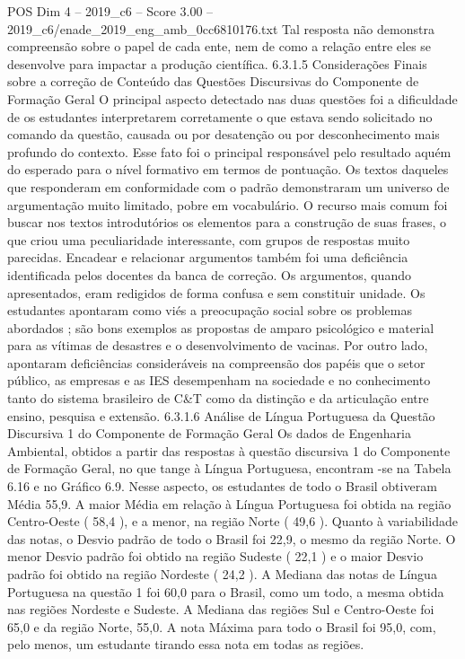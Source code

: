 \begin{textsample}{POS Dim 4 – 2019\_c6 – Score 3.00 – 2019\_c6/enade\_2019\_eng\_amb\_0cc6810176.txt}
Tal resposta não demonstra compreensão sobre o papel de cada ente, nem de como a relação entre eles se desenvolve para impactar a produção científica. 6.3.1.5 Considerações Finais sobre a correção de Conteúdo das Questões Discursivas do Componente de Formação Geral O principal aspecto detectado nas duas questões foi a dificuldade de os estudantes interpretarem corretamente o que estava sendo solicitado no comando da questão, causada ou por desatenção ou por desconhecimento mais profundo do contexto.
Esse fato foi o principal responsável pelo resultado aquém do esperado para o nível formativo em termos de pontuação.
Os textos daqueles que responderam em conformidade com o padrão demonstraram um universo de argumentação muito limitado, pobre em vocabulário.
O recurso mais comum foi buscar nos textos introdutórios os elementos para a construção de suas frases, o que criou uma peculiaridade interessante, com grupos de respostas muito parecidas.
Encadear e relacionar argumentos também foi uma deficiência identificada pelos docentes da banca de correção.
Os argumentos, quando apresentados, eram redigidos de forma confusa e sem constituir unidade.
Os estudantes apontaram como viés a preocupação social sobre os problemas abordados ; são bons exemplos as propostas de amparo psicológico e material para as vítimas de desastres e o desenvolvimento de vacinas.
Por outro lado, apontaram deficiências consideráveis na compreensão dos papéis que o setor público, as empresas e as IES desempenham na sociedade e no conhecimento tanto do sistema brasileiro de C\&T como da distinção e da articulação entre ensino, pesquisa e extensão. 6.3.1.6 Análise de Língua Portuguesa da Questão Discursiva 1 do Componente de Formação Geral Os dados de Engenharia Ambiental, obtidos a partir das respostas à questão discursiva 1 do Componente de Formação Geral, no que tange à Língua Portuguesa, encontram -se na Tabela 6.16 e no Gráfico 6.9.
Nesse aspecto, os estudantes de todo o Brasil obtiveram Média 55,9.
A maior Média em relação à Língua Portuguesa foi obtida na região Centro-Oeste ( 58,4 ), e a menor, na região Norte ( 49,6 ).
Quanto à variabilidade das notas, o Desvio padrão de todo o Brasil foi 22,9, o mesmo da região Norte.
O menor Desvio padrão foi obtido na região Sudeste ( 22,1 ) e o maior Desvio padrão foi obtido na região Nordeste ( 24,2 ).
A Mediana das notas de Língua Portuguesa na questão 1 foi 60,0 para o Brasil, como um todo, a mesma obtida nas regiões Nordeste e Sudeste.
A Mediana das regiões Sul e Centro-Oeste foi 65,0 e da região Norte, 55,0.
A nota Máxima para todo o Brasil foi 95,0, com, pelo menos, um estudante tirando essa nota em todas as regiões.

\end{textsample}
